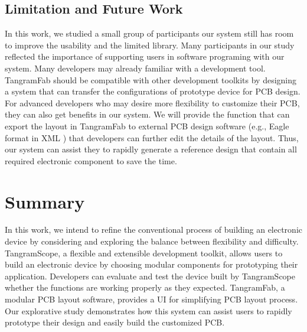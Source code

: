 \subsection{Limitation and Future Work}
In this work, we studied a small group of participants our system still has room to improve the usability and the limited library.
Many participants in our study reflected the importance of supporting users in software programing with our system.
Many developers may already familiar with a development tool.
TangramFab should be compatible with other development toolkits by designing a system that can transfer the configurations of prototype device for PCB design.
For advanced developers who may desire more flexibility to customize their PCB, they can  also get benefits in our system.
We will provide the function that can export the layout in TangramFab to external PCB design software (e.g., Eagle format in XML \cite{eagle}) that developers can further edit the details of the layout.
Thus, our system can assist they to rapidly generate a reference design that contain all required electronic component to save the time.

\section{Summary}
In this work, we intend to refine the conventional process of building an electronic device by considering and exploring the balance between flexibility and difficulty.
TangramScope, a flexible and extensible development toolkit, allows users to build an electronic device by choosing modular components for prototyping their application.
Developers can evaluate and test the device built by TangramScope whether the functions are working properly as they expected.
TangramFab, a modular PCB layout software, provides a UI for simplifying PCB layout process.
Our explorative study demonstrates how this system can assist users to rapidly prototype their design and easily build the customized PCB.
